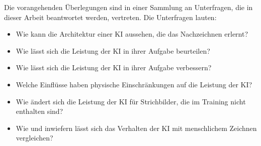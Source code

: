 Die vorangehenden Überlegungen sind in einer Sammlung an Unterfragen, die in
dieser Arbeit beantwortet werden, vertreten. Die Unterfragen lauten:
\begin{itemize}
   \item Wie kann die Architektur einer KI aussehen, die das Nachzeichnen erlernt?
   \item Wie lässt sich die Leistung der KI in ihrer Aufgabe beurteilen?
   \item Wie lässt sich die Leistung der KI in ihrer Aufgabe verbessern?
   \item Welche Einflüsse haben physische Einschränkungen auf die Leistung der KI?
   \item Wie ändert sich die Leistung der KI für Strichbilder, die im Training nicht enthalten sind?
   \item Wie und inwiefern lässt sich das Verhalten der KI mit menschlichem Zeichnen vergleichen?
\end{itemize}
